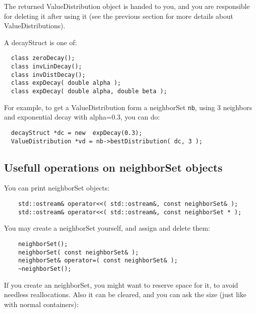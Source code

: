 \documentclass{report}
\begin{document}
The returned ValueDistribution object is handed to you, and you are
responsible for deleting it after using it (see the previous section
for more details about ValueDistributions).

A decayStruct is one of:

\begin{footnotesize}
\begin{verbatim}
  class zeroDecay();
  class invLinDecay();
  class invDistDecay();
  class expDecay( double alpha );
  class expDecay( double alpha, double beta );
\end{verbatim}
\end{footnotesize}
 
For example, to get a ValueDistribution form a neighborSet {\tt nb}, using
3 neighbors and exponential decay with alpha=0.3, you can do:

\begin{footnotesize}
\begin{verbatim}
  decayStruct *dc = new  expDecay(0.3);
  ValueDistribution *vd = nb->bestDistribution( dc, 3 );
\end{verbatim}
\end{footnotesize}


\subsection{Usefull operations on neighborSet objects}

You can print neighborSet objects:

\begin{footnotesize}
\begin{verbatim}
    std::ostream& operator<<( std::ostream&, const neighborSet& );
    std::ostream& operator<<( std::ostream&, const neighborSet * );
\end{verbatim}
\end{footnotesize}

You may create a neighborSet yourself, and assign and delete them:

\begin{footnotesize}
\begin{verbatim}
    neighborSet();
    neighborSet( const neighborSet& );
    neighborSet& operator=( const neighborSet& );
    ~neighborSet();
\end{verbatim}
\end{footnotesize}

If you create an neighborSet, you might want to reserve space for it,
to avoid needless reallocations. Also it can be cleared, and you can
ask the size (just like with normal containers):
\end{document}
